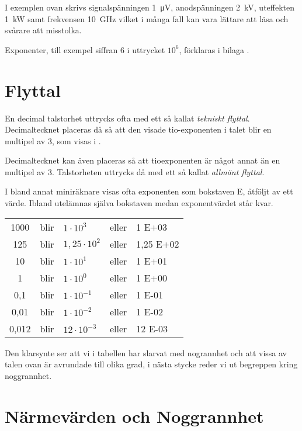 I exemplen ovan skrivs signalspänningen \SI{1}{\micro\volt},
anodspänningen \SI{2}{\kilo\volt}, uteffekten \SI{1}{\kilo\watt} samt
frekvensen \SI{10}{\giga\hertz} vilket i många fall kan vara lättare
att läsa och svårare att misstolka.


Exponenter, till exempel siffran 6 i uttrycket \(10^6\), förklaras i
bilaga .


\section{Flyttal}

En decimal talstorhet uttrycks ofta med ett så kallat \emph{tekniskt
flyttal}.  Decimaltecknet placeras då så att den visade tio-exponenten
i talet blir en multipel av 3, som visas i .

Decimaltecknet kan även placeras så att tioexponenten är något annat
än en multipel av 3.  Talstorheten uttrycks då med ett så kallat
\emph{allmänt flyttal}.

I bland annat miniräknare visas ofta exponenten som bokstaven E,
åtföljt av ett värde.  Ibland utelämnas själva bokstaven medan
exponentvärdet står kvar.

\bigskip

\noindent\begin{tabular}{Sllll}
1000  & blir & \(1    \cdot 10^3  \) & eller & 1 E+03 \\
125   & blir & \(1,25 \cdot 10^2  \) & eller & 1,25 E+02 \\
10    & blir & \(1    \cdot 10^1  \) & eller & 1 E+01 \\
1     & blir & \(1    \cdot 10^0  \) & eller & 1 E+00 \\
0,1   & blir & \(1    \cdot 10^{-1}\) & eller & 1 E-01 \\
0,01  & blir & \(1    \cdot 10^{-2}\) & eller & 1 E-02 \\
0,012 & blir & \(12   \cdot 10^{-3}\) & eller & 12 E-03 \\
\end{tabular}

\bigskip

Den klarsynte ser att vi i tabellen har slarvat med nogrannhet och att
vissa av talen ovan är avrundade till olika grad, i nästa stycke reder
vi ut begreppen kring noggrannhet.

\section{Närmevärden och Noggrannhet}

